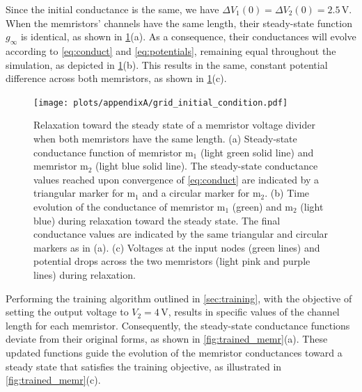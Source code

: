 \documentclass[reprint,superscriptaddress,prb,showkeys]{revtex4-2}
\newcommand{\m}{\text{m}} %
\begin{document}
Since the initial conductance is the same, we have $\Delta V_1(0) = \Delta V_2(0) = 2.5\,\text{V}$. When the memristors' channels have the same length, their steady-state function $g_{\infty}$ is identical, as shown in \cref{fig:equal_memr}(a). As a consequence, their conductances will evolve according to \cref{eq:conduct} and \cref{eq:potentials}, remaining equal throughout the simulation, as depicted in \cref{fig:equal_memr}(b). This results in the same, constant potential difference across both memristors, as shown in \cref{fig:equal_memr}(c).
\begin{figure}[h]
    \centering
    \texttt{[image: plots/appendixA/grid\_initial\_condition.pdf]}
    \caption{Relaxation toward the steady state of a memristor voltage divider when both memristors have the same length. (a) Steady-state conductance function of memristor $\m_1$ (light green solid line) and memristor $\m_2$ (light blue solid line). The steady-state conductance values reached upon convergence of \cref{eq:conduct} are indicated by a triangular marker for $\m_1$ and a circular marker for $\m_2$. (b) Time evolution of the conductance of memristor $\m_1$ (green) and $\m_2$ (light blue) during relaxation toward the steady state. The final conductance values are indicated by the same triangular and circular markers as in (a). (c) Voltages at the input nodes (green lines) and potential drops across the two memristors (light pink and purple lines) during relaxation.
    }
    \label{fig:equal_memr}
\end{figure} 

Performing the training algorithm outlined in \cref{sec:training}, with the objective of setting the output voltage to $V_2 = 4\,\mathrm{V}$, results in specific values of the channel length for each memristor. Consequently, the steady-state conductance functions deviate from their original forms, as shown in \cref{fig:trained_memr}(a). These updated functions guide the evolution of the memristor conductances toward a steady state that satisfies the training objective, as illustrated in \cref{fig:trained_memr}(c). 
\end{document}
